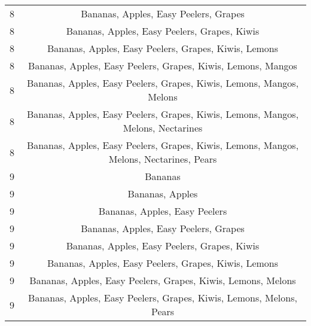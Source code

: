 \documentclass[11pt]{article}
\begin{document}
\begin{table}[h]
\begin{center}
\begin{tabular}{lc}
8 & Bananas, Apples, Easy Peelers, Grapes \\
8 & Bananas, Apples, Easy Peelers, Grapes, Kiwis \\
8 & Bananas, Apples, Easy Peelers, Grapes, Kiwis, Lemons \\
8 & Bananas, Apples, Easy Peelers, Grapes, Kiwis, Lemons, Mangos \\
8 & Bananas, Apples, Easy Peelers, Grapes, Kiwis, Lemons, Mangos, Melons \\
8 & Bananas, Apples, Easy Peelers, Grapes, Kiwis, Lemons, Mangos, Melons, Nectarines \\
8 & Bananas, Apples, Easy Peelers, Grapes, Kiwis, Lemons, Mangos, Melons, Nectarines, Pears \\
9 & Bananas \\
9 & Bananas, Apples \\
9 & Bananas, Apples, Easy Peelers \\
9 & Bananas, Apples, Easy Peelers, Grapes \\
9 & Bananas, Apples, Easy Peelers, Grapes, Kiwis \\
9 & Bananas, Apples, Easy Peelers, Grapes, Kiwis, Lemons \\
9 & Bananas, Apples, Easy Peelers, Grapes, Kiwis, Lemons, Melons \\
9 & Bananas, Apples, Easy Peelers, Grapes, Kiwis, Lemons, Melons, Pears \\
\hline \hline
\end{tabular}
\end{center}
\end{table}
\end{document}
